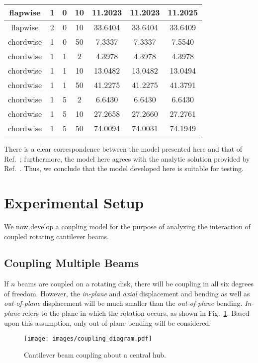 \begin{center}
\begin{longtable}[!hbt]{|c|c|c|c|c|c|c|}
flapwise & 1 & 0 & 10 & 11.2023 & 11.2023 & 11.2025\\ 
\hline
flapwise & 2 & 0 & 10 & 33.6404 & 33.6404 & 33.6409\\ 
\hline
chordwise & 1 & 0 & 50 & 7.3337 & 7.3337 & 7.5540\\ 
\hline
chordwise & 1 & 1 & 2 & 4.3978 & 4.3978 & 4.3978\\ 
\hline
chordwise & 1 & 1 & 10 & 13.0482 & 13.0482 & 13.0494\\ 
\hline
chordwise & 1 & 1 & 50 & 41.2275 & 41.2275 & 41.3791\\ 
\hline
chordwise & 1 & 5 & 2 & 6.6430 & 6.6430 & 6.6430\\ 
\hline
chordwise & 1 & 5 & 10 & 27.2658 & 27.2660 & 27.2761\\ 
\hline
chordwise & 1 & 5 & 50 & 74.0094 & 74.0031 & 74.1949\\ 
\hline
\end{longtable}

\end{center}
There is a clear correspondence between the model presented here and that of Ref.~\cite{chung2002dynamic}; furthermore, the model here agrees with the analytic solution provided by Ref.~\cite{wright82vibration}. Thus, we conclude that the model developed here is suitable for testing.

\section{Experimental Setup}
\label{sec:exp}
We now develop a coupling model for the purpose of analyzing the interaction of coupled rotating cantilever beams. 

\subsection{Coupling Multiple Beams}
If $n$ beams are coupled on a rotating disk, there will be coupling in all six degrees of freedom. However, the \emph{in-plane} and \emph{axial} displacement and bending as well as \emph{out-of-plane} displacement will be much smaller than the \emph{out-of-plane} bending. \emph{In-plane} refers to the plane in which the rotation occurs, as shown in Fig.~\ref{fig:coupling_diag_jam}. Based upon this assumption, only out-of-plane bending will be considered.

\begin{figure}[ht!]
\caption{Cantilever beam coupling about a central hub.}
\label{fig:coupling_diag_jam}
\centering
\texttt{[image: images/coupling\_diagram.pdf]}
\end{figure}

